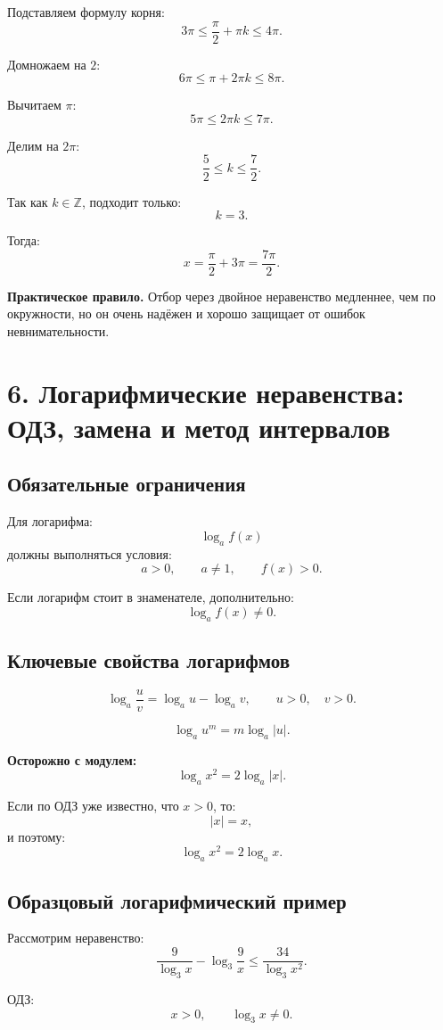 \documentclass[a4paper,12pt]{article}
\newcommand{\important}[1]{\textcolor{darkaccent}{\textbf{#1}}}
\begin{document}
Подставляем формулу корня:
\[
3\pi\le \frac{\pi}{2}+\pi k\le 4\pi.
\]

Домножаем на $2$:
\[
6\pi\le \pi+2\pi k\le 8\pi.
\]

Вычитаем $\pi$:
\[
5\pi\le 2\pi k\le 7\pi.
\]

Делим на $2\pi$:
\[
\frac52\le k\le \frac72.
\]

Так как $k\in\mathbb Z$, подходит только:
\[
k=3.
\]

Тогда:
\[
x=\frac{\pi}{2}+3\pi=\frac{7\pi}{2}.
\]

\important{Практическое правило.} Отбор через двойное неравенство медленнее, чем по окружности, но он очень надёжен и хорошо защищает от ошибок невнимательности.

\section*{6. Логарифмические неравенства: ОДЗ, замена и метод интервалов}

\subsection*{Обязательные ограничения}

Для логарифма:
\[
\log_a f(x)
\]
должны выполняться условия:
\[
a>0,\qquad a\ne1,\qquad f(x)>0.
\]

Если логарифм стоит в знаменателе, дополнительно:
\[
\log_a f(x)\ne0.
\]

\subsection*{Ключевые свойства логарифмов}

\[
\log_a\frac{u}{v}=\log_a u-\log_a v,
\qquad u>0,\quad v>0.
\]

\[
\log_a u^m=m\log_a|u|.
\]

\important{Осторожно с модулем:}
\[
\log_a x^2=2\log_a|x|.
\]

Если по ОДЗ уже известно, что $x>0$, то:
\[
|x|=x,
\]
и поэтому:
\[
\log_a x^2=2\log_a x.
\]

\subsection*{Образцовый логарифмический пример}

Рассмотрим неравенство:
\[
\frac{9}{\log_3x}-\log_3\frac{9}{x}
\le
\frac{34}{\log_3x^2}.
\]

ОДЗ:
\[
x>0,
\qquad
\log_3x\ne0.
\]
\end{document}
